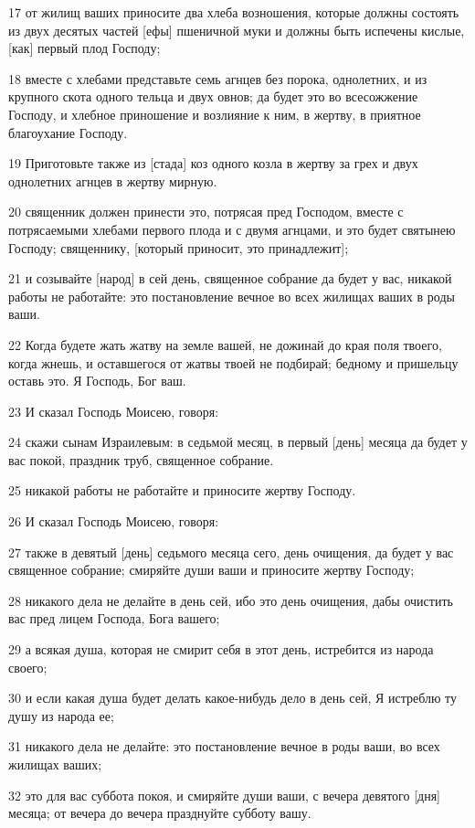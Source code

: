 \par 17 от жилищ ваших приносите два хлеба возношения, которые должны состоять из двух десятых частей [ефы] пшеничной муки и должны быть испечены кислые, [как] первый плод Господу;
\par 18 вместе с хлебами представьте семь агнцев без порока, однолетних, и из крупного скота одного тельца и двух овнов; да будет это во всесожжение Господу, и хлебное приношение и возлияние к ним, в жертву, в приятное благоухание Господу.
\par 19 Приготовьте также из [стада] коз одного козла в жертву за грех и двух однолетних агнцев в жертву мирную.
\par 20 священник должен принести это, потрясая пред Господом, вместе с потрясаемыми хлебами первого плода и с двумя агнцами, и это будет святынею Господу; священнику, [который приносит, это принадлежит];
\par 21 и созывайте [народ] в сей день, священное собрание да будет у вас, никакой работы не работайте: это постановление вечное во всех жилищах ваших в роды ваши.
\par 22 Когда будете жать жатву на земле вашей, не дожинай до края поля твоего, когда жнешь, и оставшегося от жатвы твоей не подбирай; бедному и пришельцу оставь это. Я Господь, Бог ваш.
\par 23 И сказал Господь Моисею, говоря:
\par 24 скажи сынам Израилевым: в седьмой месяц, в первый [день] месяца да будет у вас покой, праздник труб, священное собрание.
\par 25 никакой работы не работайте и приносите жертву Господу.
\par 26 И сказал Господь Моисею, говоря:
\par 27 также в девятый [день] седьмого месяца сего, день очищения, да будет у вас священное собрание; смиряйте души ваши и приносите жертву Господу;
\par 28 никакого дела не делайте в день сей, ибо это день очищения, дабы очистить вас пред лицем Господа, Бога вашего;
\par 29 а всякая душа, которая не смирит себя в этот день, истребится из народа своего;
\par 30 и если какая душа будет делать какое-нибудь дело в день сей, Я истреблю ту душу из народа ее;
\par 31 никакого дела не делайте: это постановление вечное в роды ваши, во всех жилищах ваших;
\par 32 это для вас суббота покоя, и смиряйте души ваши, с вечера девятого [дня] месяца; от вечера до вечера празднуйте субботу вашу.
